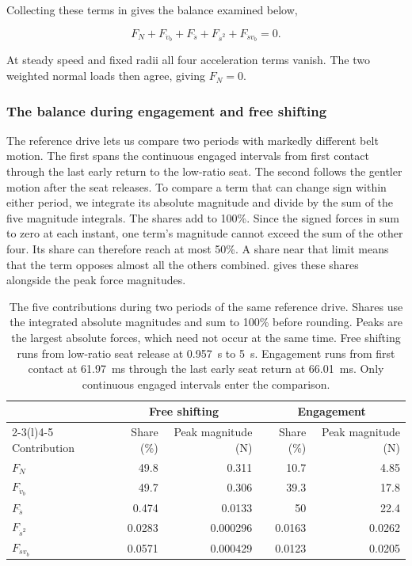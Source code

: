 \documentclass[11pt]{report}
\numberwithin{equation}{section}
\begin{document}
Collecting these terms in 
gives the balance examined below,

\begin{equation}
 F_N+F_{\dot v_b}+F_{\ddot s}+F_{\dot s^2}+F_{\dot s v_b}=0.
 \label{eq:results_belt_term_balance}
\end{equation}

At steady speed and fixed radii all four acceleration terms vanish.
The two weighted normal loads then agree, giving \(F_N=0\).

\subsubsection{The balance during engagement and free shifting}
\label{sec:results_belt_hierarchy}

The reference drive lets us compare two periods with markedly different
belt motion. The first spans the continuous engaged intervals from first
contact through the last early return to the low-ratio seat. The second
follows the gentler motion after the seat releases. To compare a term
that can change sign within either period, we integrate its absolute
magnitude and divide by the sum of the five magnitude integrals. The
shares add to 100\%. Since the signed forces in
 sum to zero at each instant, one
term's magnitude cannot exceed the sum of the other four. Its share can
therefore reach at most 50\%. A share near that limit means that the
term opposes almost all the others combined. 
gives these shares alongside the peak force magnitudes.

\begin{table}[H]
 \centering\small
 \setlength{\tabcolsep}{7pt}\renewcommand{\arraystretch}{1.2}
 \begin{tabular}{@{}lrrrr@{}}
 \toprule
 & \multicolumn{2}{c}{Free shifting} & \multicolumn{2}{c}{Engagement} \\
 \cmidrule(lr){2-3}\cmidrule(l){4-5}
 Contribution & Share (\%) & Peak magnitude (\si{N})
              & Share (\%) & Peak magnitude (\si{N}) \\
 \midrule
 \(F_N\) & 49.8 & 0.311 & 10.7 & 4.85 \\
 \(F_{\dot v_b}\) & 49.7 & 0.306 & 39.3 & 17.8 \\
 \(F_{\ddot s}\) & 0.474 & 0.0133 & 50 & 22.4 \\
 \(F_{\dot s^2}\) & 0.0283 & 0.000296 & 0.0163 & 0.0262 \\
 \(F_{\dot s v_b}\) & 0.0571 & 0.000429 & 0.0123 & 0.0205 \\
 \bottomrule
 \end{tabular}
 \caption{The five contributions during two periods of the same reference
 drive. Shares use the integrated absolute magnitudes and sum to 100\%
 before rounding. Peaks are the largest absolute forces, which need not
 occur at the same time. Free shifting runs
 from low-ratio seat release at \SI{0.957}{s} to \SI{5}{s}. Engagement runs
 from first contact at \SI{61.97}{ms} through the last early seat return at
 \SI{66.01}{ms}. Only continuous engaged intervals enter the comparison.}
 \label{tab:results_belt_hierarchy}
\end{table}
\end{document}
